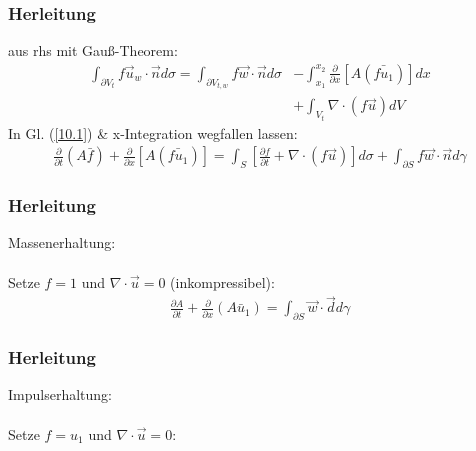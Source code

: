 \begin{frame}\frametitle{Herleitung}
  aus rhs mit Gauß-Theorem:
  \begin{equation}
  \begin{aligned}
    \int_{\partial V_t} f \vec u_w \cdot \vec n d\sigma = \int_{\partial V_{t, w}} f \vec w \cdot \vec n d\sigma &- \int_{x_1}^{x_2} \frac{\partial}{\partial x} \left[  A (\bar{f u_1}) \right] dx \\&+ \int_{V_t} \nabla \cdot (f \vec u) dV
  \end{aligned} %
\end{equation} %
In Gl. (\ref{10.1}) \& x-Integration wegfallen lassen:
\begin{align}
\boxed{
\frac{\partial}{\partial t} (A \bar f) + \frac{\partial}{\partial x} \left[ A (\bar{f u_1}) \right] = \int_S \left[ \frac{\partial f}{\partial t}
+ \nabla \cdot (f\vec u) \right] d \sigma
+ \int_{\partial S} f \vec w \cdot \vec n d \gamma} %
\end{align}
\end{frame}

\begin{frame}\frametitle{Herleitung}
Massenerhaltung:\\~\\
Setze $f=1$ und $\nabla \cdot \vec u = 0$ (inkompressibel):
\begin{align}
  \frac{\partial A}{\partial t} + \frac{\partial}{\partial x} (A \bar u_1) = \int_{\partial S} \vec w \cdot \vec d d\gamma %
\end{align}
\end{frame}

\begin{frame}\frametitle{Herleitung}
  Impulserhaltung:\\~\\
  Setze $f=u_1$ und $\nabla \cdot \vec u = 0$:
\end{frame}
